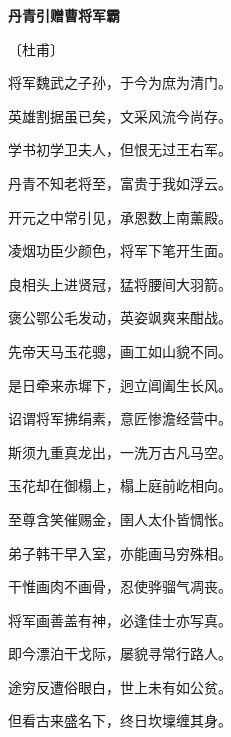 \documentclass[12pt,UTF-8,openany,fontset=none]{ctexbook}
\begin{document}

\begin{center}
    {\bfseries 丹青引赠曹将军霸}

    \vspace{18pt}

    \begin{large}\xuwen
        〔杜甫〕
    \end{large}

\end{center}

    \vspace{18pt}  %

\begin{center}
    \begin{Large}

        将军魏武之子孙，于今为庶为清门。

        英雄割据虽已矣，文采风流今尚存。

        学书初学卫夫人，但恨无过王右军。

        丹青不知老将至，富贵于我如浮云。

        开元之中常引见，承恩数上南薰殿。

        凌烟功臣少颜色，将军下笔开生面。

        良相头上进贤冠，猛将腰间大羽箭。

        褒公鄂公毛发动，英姿飒爽来酣战。

        先帝天马玉花骢，画工如山貌不同。

        是日牵来赤墀下，迥立阊阖生长风。

        诏谓将军拂绢素，意匠惨澹经营中。

        斯须九重真龙出，一洗万古凡马空。

        玉花却在御榻上，榻上庭前屹相向。

        至尊含笑催赐金，圉人太仆皆惆怅。

        弟子韩干早入室，亦能画马穷殊相。

        干惟画肉不画骨，忍使骅骝气凋丧。

        将军画善盖有神，必逢佳士亦写真。

        即今漂泊干戈际，屡貌寻常行路人。

        途穷反遭俗眼白，世上未有如公贫。

        但看古来盛名下，终日坎壈缠其身。

    \end{Large}

\end{center}
\end{document}
